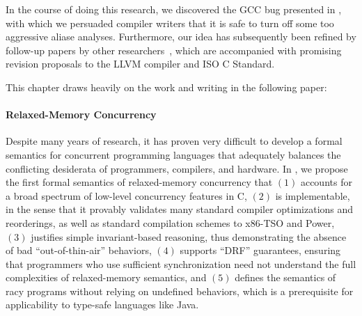 In the course of doing this research, we discovered the GCC bug presented in
, with which we persuaded compiler writers that it is safe to turn off
some too aggressive aliase analyses.  Furthermore, our idea has subsequently been refined by
follow-up papers by other researchers~\cite{intptrcast-oopsla,intptrcast-popl}, which are
accompanied with promising revision proposals to the LLVM compiler and ISO C Standard.



This chapter draws heavily on the work and writing in the following paper:


\paragraph{Relaxed-Memory Concurrency}

Despite many years of research, it has proven very difficult to develop a formal semantics for
concurrent programming languages that adequately balances the conflicting desiderata of programmers,
compilers, and hardware.  In , we propose the first formal semantics of
relaxed-memory concurrency that $(1)$ accounts for a broad spectrum of low-level concurrency
features in C, $(2)$ is implementable, in the sense that it provably validates many standard
compiler optimizations and reorderings, as well as standard compilation schemes to x86-TSO and
Power, $(3)$ justifies simple invariant-based reasoning, thus demonstrating the absence of bad
``out-of-thin-air'' behaviors, $(4)$ supports ``DRF'' guarantees, ensuring that programmers who use
sufficient synchronization need not understand the full complexities of relaxed-memory semantics,
and $(5)$ defines the semantics of racy programs without relying on undefined behaviors, which is a
prerequisite for applicability to type-safe languages like Java.

